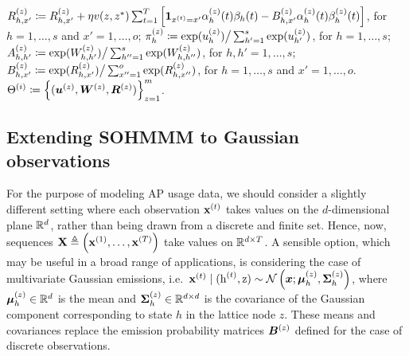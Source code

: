 \begin{algorithm}
\begin{algorithmic}[1]
        \vspace{0.3cm}
        \State $ {R}^{(z)}_{h,x'} \coloneqq {R}^{(z)}_{h,x'} + \eta v(z,z^*) \sum_{t=1}^{T}\left[\bm{1}_{x^{(t)}=x'}\alpha_{h}^{(z)}(t)\beta_{h}(t) - {B}^{(z)}_{h,x'}\alpha_{h}^{(z)}(t)\beta_{h}^{(z)}(t) \right]$, for $h = 1, \dots, s$ and $x' = 1,\dots,o$;
        \vspace{0.3cm}
        \State ${\pi}_h^{(z)} \coloneqq \exp({u}_h^{(z)}) \big/ \sum_{h'=1}^{s}\exp({u}_{h'}^{(z)})$, for $h = 1, \dots, s$;
        \vspace{0.3cm}
        \State $ {A}^{(z)}_{h,h'} \coloneqq \exp({W}^{(z)}_{h,h'}) \big/ \sum_{h''=1}^{s} \exp({W}^{(z)}_{h,h''})$, for $h,h' = 1, \dots, s$;
        \vspace{0.3cm}
        \State ${B}^{(z)}_{h,x'} \coloneqq \exp({R}^{(z)}_{h,x'}) \big/ \sum_{x''=1}^{o} \exp({R}^{(z)}_{h,x''})$, for $h = 1, \dots, s$ and $x' = 1,\dots,o$.
        \vspace{0.3cm}
        \EndFor
        \vspace{0.3cm}
        \State $\Theta^{(i)} \coloneqq \left\lbrace ({\bm{u}}^{(z)}, {\bm{W}}^{(z)}, {\bm{R}}^{(z)}) \right\rbrace_{z=1}^m$.
        \vspace{0.3cm}
        \EndFor

    \end{algorithmic}
\end{algorithm}

\subsection{Extending SOHMMM to Gaussian observations}
\label{sec:sohmmm_gaussian}

For the purpose of modeling AP usage data, we should consider a slightly different setting where each observation ${\mathbf{x}}^{(t)}$ takes values on the $d$-dimensional plane ${\mathbb{R}}^d$, rather than being drawn from a discrete and finite set. Hence, now, sequences ${\mathbf{X}} \triangleq \left({\mathbf{x}}^{(1)}, \dots, {\mathbf{x}}^{(T)} \right)$ take values on ${\mathbb{R}}^{d \times T}$. A sensible option, which may be useful in a broad range of applications, is considering the case of multivariate Gaussian emissions, i.e.\ ${\mathbf{x}}^{(t)} \mid ({\textnormal{h}}^{(t)}, {\textnormal{z}}) \sim \mathcal{N}\left({\bm{x}}; {\bm{\mu}}^{(z)}_h, {\bm{\Sigma}}^{(z)}_h\right)$, where ${\bm{\mu}}^{(z)}_h \in {\mathbb{R}}^d$ is the mean and ${\bm{\Sigma}}^{(z)}_h \in {\mathbb{R}}^{d \times d}$ is the covariance of the Gaussian component corresponding to state $h$ in the lattice node $z$. These means and covariances replace the emission probability matrices ${\bm{B}}^{(z)}$ defined for the case of discrete observations.

